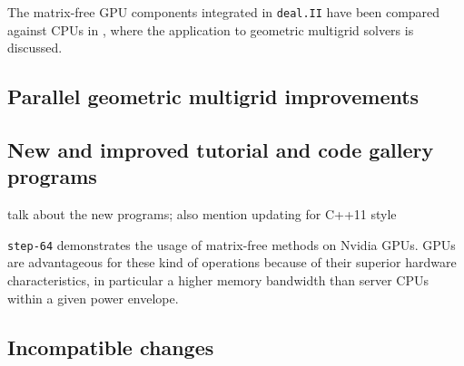 \documentclass{ansarticle-preprint}
\newcommand{\specialword}[1]{\texttt{#1}}
\newcommand{\dealii}{{\specialword{deal.II}}\xspace}
\begin{document}
The matrix-free GPU components integrated in \dealii have been compared against
CPUs in \cite{KronbichlerLjungkvist2019}, where the application to geometric
multigrid solvers is discussed.

\subsection{Parallel geometric multigrid improvements}
\label{subsec:gmg}


\subsection{New and improved tutorial and code gallery programs}
\label{subsec:steps}


talk about the new programs; also mention updating for C++11 style


\texttt{step-64} demonstrates the usage of matrix-free methods on Nvidia GPUs.
GPUs are advantageous for these kind of operations because of their superior
hardware characteristics, in particular a higher memory bandwidth than server
CPUs within a given power envelope.

\subsection{Incompatible changes}
\end{document}
